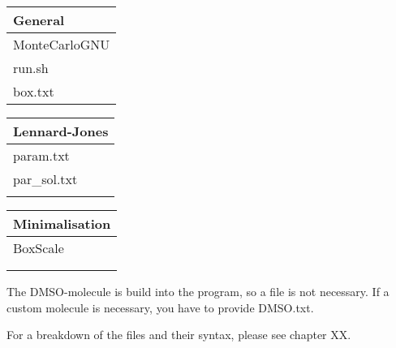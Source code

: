 \begin{tabular}{l}
	General \\ \hline
	MonteCarloGNU \\
	run.sh \\
	box.txt \\
\end{tabular}
\hspace{0.5cm}
\begin{tabular}{l}
	Lennard-Jones \\ \hline
	param.txt \\
	par\_sol.txt \\
	\null \\
\end{tabular}
\hspace{0.5cm}
\begin{tabular}{l}
	Minimalisation \\ \hline
	BoxScale \\
	\null \\
	\null \\
\end{tabular}

The DMSO-molecule is build into the program, so a file is not necessary.
If a custom molecule is necessary, you have to provide DMSO.txt.

For a breakdown of the files and their syntax, please see chapter XX.